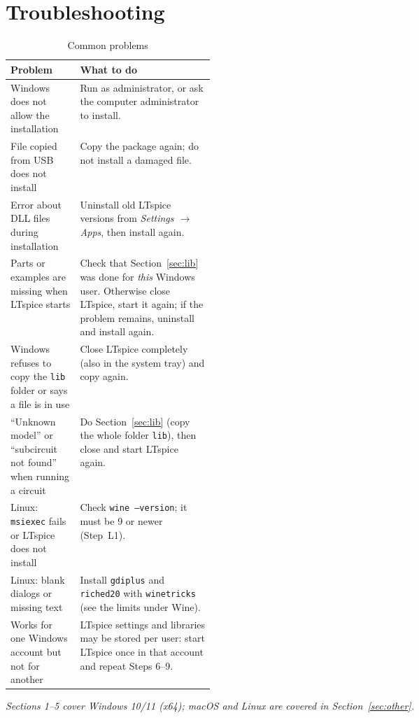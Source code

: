 \section{Troubleshooting}
\begin{table}[H]\centering\renewcommand{\arraystretch}{1.25}
\begin{tabularx}{\linewidth}{>{\raggedright\arraybackslash}p{0.34\linewidth} X}
\toprule
\textbf{Problem} & \textbf{What to do} \\ \midrule
Windows does not allow the installation & Run as administrator, or ask the computer administrator to install. \\
File copied from USB does not install & Copy the package again; do not install a damaged file. \\
Error about DLL files during installation & Uninstall old LTspice versions from \textit{Settings $\rightarrow$ Apps}, then install again. \\
Parts or examples are missing when LTspice starts & Check that Section~\ref{sec:lib} was done for \emph{this} Windows user. Otherwise close LTspice, start it again; if the problem remains, uninstall and install again. \\
Windows refuses to copy the \texttt{lib} folder or says a file is in use & Close LTspice completely (also in the system tray) and copy again. \\
``Unknown model'' or ``subcircuit not found'' when running a circuit & Do Section~\ref{sec:lib} (copy the whole folder \texttt{lib}), then close and start LTspice again. \\
Linux: \texttt{msiexec} fails or LTspice does not install & Check \texttt{wine --version}; it must be 9 or newer (Step~L1). \\
Linux: blank dialogs or missing text & Install \texttt{gdiplus} and \texttt{riched20} with \texttt{winetricks} (see the limits under Wine). \\
Works for one Windows account but not for another & LTspice settings and libraries may be stored per user: start LTspice once in that account and repeat Steps 6--9. \\
\bottomrule
\end{tabularx}
\caption{Common problems}
\end{table}

\noindent\textit{Sections 1--5 cover Windows 10/11 (x64); macOS and Linux are covered in Section~\ref{sec:other}.}
